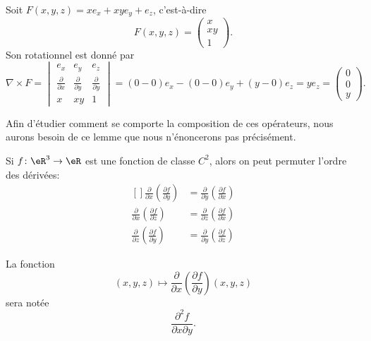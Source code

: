 \begin{example}
	Soit \( F(x,y,z)=x e_x+xy e_y+e_z\), c'est-à-dire
	\begin{equation}
		F(x,y,z)=\begin{pmatrix}
			x  \\
			xy \\
			1
		\end{pmatrix}.
	\end{equation}
	Son rotationnel est donné par
	\begin{equation}
		\nabla\times F=\begin{vmatrix}
			e_x                              & e_y                              & e_z                              \\
			\frac{ \partial  }{ \partial x } & \frac{ \partial  }{ \partial y } & \frac{ \partial  }{ \partial y } \\
			x                                & xy                               & 1
		\end{vmatrix}=
		(0-0)e_x-(0-0)e_y+(y-0)e_z=ye_z=\begin{pmatrix}
			0 \\
			0 \\
			y
		\end{pmatrix}.
	\end{equation}
\end{example}

Afin d'étudier comment se comporte la composition de ces opérateurs, nous aurons besoin de ce lemme que nous n'énoncerons pas précisément.
\begin{lemma}       \label{LemPermDerrxyz}
	Si \( f\colon \eR^3\to \eR\) est une fonction de classe \( C^2\), alors on peut permuter l'ordre des dérivées:
	\begin{equation}
		\begin{aligned}[]
			\frac{ \partial  }{ \partial x }\left( \frac{ \partial f }{ \partial y } \right) & =\frac{ \partial  }{ \partial y }\left( \frac{ \partial f }{ \partial x } \right) \\
			\frac{ \partial  }{ \partial x }\left( \frac{ \partial f }{ \partial z } \right) & =\frac{ \partial  }{ \partial z }\left( \frac{ \partial f }{ \partial x } \right) \\
			\frac{ \partial  }{ \partial z }\left( \frac{ \partial f }{ \partial y } \right) & =\frac{ \partial  }{ \partial y }\left( \frac{ \partial f }{ \partial z } \right)
		\end{aligned}
	\end{equation}
\end{lemma}
La fonction
\begin{equation}
	(x,y,z)\mapsto\frac{ \partial  }{ \partial x }\left( \frac{ \partial f }{ \partial y } \right)(x,y,z)
\end{equation}
sera notée
\begin{equation}
	\frac{ \partial^2f }{ \partial x\partial y }.
\end{equation}

